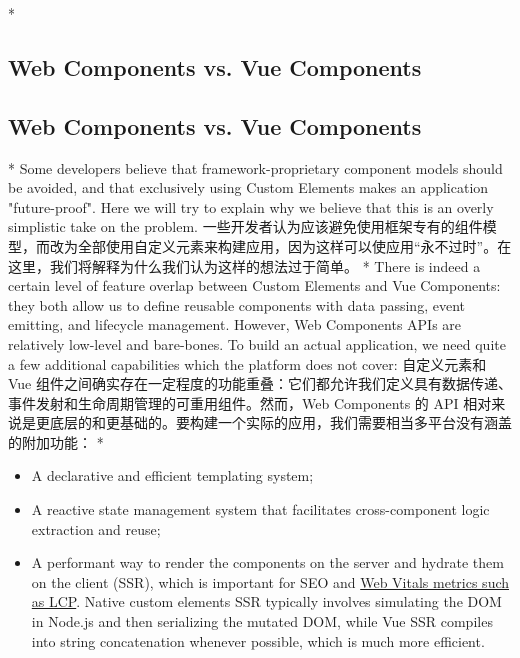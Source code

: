 \begin{paracol}{2} 
 
\switchcolumn[0]*%
\subsection{Web Components vs. Vue Components}
\switchcolumn
\subsection{Web Components vs. Vue Components}
\switchcolumn[0]*%
Some developers believe that framework-proprietary component models
should be avoided, and that exclusively using Custom Elements makes an
application "future-proof". Here we will try to explain why we believe
that this is an overly simplistic take on the problem.
\switchcolumn
一些开发者认为应该避免使用框架专有的组件模型，而改为全部使用自定义元素来构建应用，因为这样可以使应用``永不过时''。在这里，我们将解释为什么我们认为这样的想法过于简单。
\switchcolumn[0]*%
There is indeed a certain level of feature overlap between Custom
Elements and Vue Components: they both allow us to define reusable
components with data passing, event emitting, and lifecycle management.
However, Web Components APIs are relatively low-level and bare-bones. To
build an actual application, we need quite a few additional capabilities
which the platform does not cover:
\switchcolumn
自定义元素和 Vue
组件之间确实存在一定程度的功能重叠：它们都允许我们定义具有数据传递、事件发射和生命周期管理的可重用组件。然而，Web
Components 的 API
相对来说是更底层的和更基础的。要构建一个实际的应用，我们需要相当多平台没有涵盖的附加功能：
\switchcolumn[0]*%
\begin{itemize}
\item
  A declarative and efficient templating system;
\item
  A reactive state management system that facilitates cross-component
  logic extraction and reuse;
\item
  A performant way to render the components on the server and hydrate
  them on the client (SSR), which is important for SEO and
  \href{https://web.dev/vitals/}{Web Vitals metrics such as LCP}. Native
  custom elements SSR typically involves simulating the DOM in Node.js
  and then serializing the mutated DOM, while Vue SSR compiles into
  string concatenation whenever possible, which is much more efficient.
\end{itemize}
\switchcolumn
\begin{itemize}

\end{itemize}
\end{paracol}
